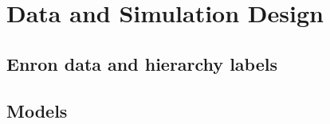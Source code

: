 \chapter{Data and Simulation Design}
\label{ch:design}

\section{Enron data and hierarchy labels}




\section{Models}



